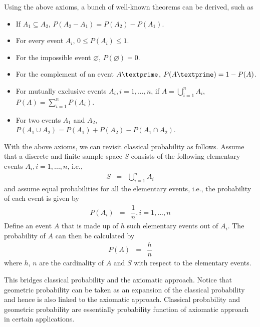 Using the above axioms, a bunch of well-known theorems can be derived, such as
\begin{itemize}
  \item If $A_1 \subseteq A_2$, $P(A_2-A_1) = P(A_2)-P(A_1)$.
  \item For every event $A_i$, $0\leq P(A_i) \leq 1$.
  \item For the impossible event $\varnothing$, $P(\varnothing)=0$.
  \item For the complement of an event $A\textprime$, $P(A\textprime)=1-P(A)$.
  \item For mutually exclusive events $A_i, i=1,...,n$, if $A = \bigcup_{i=1}^{n} A_i$, $P(A) = \sum_{i=1}^{n}P(A_i)$.
  \item For two events $A_1$ and $A_2$, $P\left(A_1\cup A_2\right) = P(A_1)+P(A_2)-P\left(A_1\cap A_2\right)$.
\end{itemize}

With the above axioms, we can revisit classical probability as follows. Assume that a discrete and finite sample space $S$ consists of the following elementary events $A_i, i=1,...,n$, i.e.,
\begin{eqnarray}
  S &=& \bigcup_{i=1}^{n} A_i \nonumber
\end{eqnarray}
and assume equal probabilities for all the elementary events, i.e., the probability of each event is given by
\begin{eqnarray}
  P(A_i) &=& \dfrac{1}{n}, i=1,...,n \nonumber
\end{eqnarray}
Define an event $A$ that is made up of $h$ such elementary events out of $A_i$. The probability of $A$ can then be calculated by
\begin{eqnarray}
  P(A) &=& \dfrac{h}{n} \nonumber
\end{eqnarray}
where $h$, $n$ are the cardinality of $A$ and $S$ with respect to the elementary events. 

This bridges classical probability and the axiomatic approach. Notice that geometric probability can be taken as an expansion of the classical probability and hence is also linked to the axiomatic approach. Classical probability and geometric probability are essentially probability function of axiomatic approach in certain applications.

